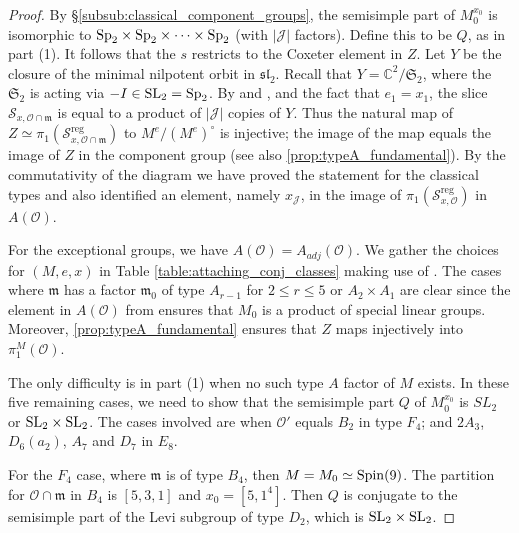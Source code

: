 \documentclass{amsart}
\theoremstyle{definition}
\DeclareMathOperator{\reg}{reg}
\newcommand{\C}{\mathbb{C}}
\newcommand{\cS}{\mathcal{S}}
\newcommand{\frakm}{\mathfrak{m}}
\newcommand{\frakS}{\mathfrak{S}}
\newcommand{\0}{\mathcal{O}}
\begin{document}
\begin{proof}
By \S \ref{subsub:classical_component_groups}, 
the semisimple part of 
$M_0^{x_0}$ is isomorphic to 
$\rm{Sp}_2 \times \rm{Sp}_2 \times \dots \times \rm{Sp}_2$ (with $|\mathcal J|$ factors).  Define this to be $Q$, as in part (1). It follows that the $s$ restricts to the Coxeter element in $Z$.
Let $Y$ be the closure of the minimal nilpotent orbit in $\mathfrak{sl}_2$.  
Recall that $Y = \C^2/\frakS_2$, where the $\frakS_2$ is acting via $-I \in \rm{SL}_2 = \rm{Sp}_2$.
By \cite{FJLS23} and \cite{Kraft-Procesi:classical}, and the fact that $e_1=x_1$,
the slice $\cS_{x, \0 \cap \frakm}$ is equal to a product of $|\mathcal J|$ copies of $Y$.  
Thus the natural map of $Z \simeq \pi_1(\cS^{\reg}_{x, \0 \cap \frakm})$ to  $M^e/(M^e)^\circ$ is injective; 
the image of the map equals the image of $Z$ in the component group (see 
also \cref{prop:typeA_fundamental}).  
By the commutativity of the diagram we have proved the statement for the classical types and also identified
an element, namely $x_{\mathcal J}$, in the image of $\pi_1(\cS^{\reg}_{x, \0})$ in $A(\0)$.

For the exceptional groups, we have $A(\0) = A_{adj}(\0)$.  We gather the choices for $(M,e,x)$ in Table \ref{table:attaching_conj_classes}
making use of \cite{Sommers:Bala-Carter}.
The cases where $\frakm$ has a factor $\frakm_0$
of type $A_{r-1}$ for $2 \leq r \leq 5$ or $A_2 \times A_1$ are clear since the element in $A(\0)$ from \cite{Sommers:Bala-Carter} ensures that $M_0$ is a product of special linear groups.  Moreover, 
\cref{prop:typeA_fundamental} ensures
that $Z$ maps injectively into $\pi_1^M(\0)$.

The only difficulty is in part (1) when no such type $A$ factor of $M$ exists.  In these five remaining cases, we need to show that the semisimple part $Q$ of $M_0^{x_0}$ is $SL_2$ or $\rm{SL}_2 \times \rm{SL}_2$.  The cases involved are when $\0'$ equals
$B_2$ in type $F_4$; and $2A_3$, $D_6(a_2)$, $A_7$ and $D_7$ in $E_8$.


For the $F_4$ case, 
where $\frakm$ is of type $B_4$, then $M=M_0 \simeq \rm{Spin}(9)$.
The partition for $\0\cap\frakm$ in $B_4$
is $[5,3,1]$ and $x_0=[5,1^4]$.  Then 
$Q$ is conjugate to the semisimple part of the 
Levi subgroup of type $D_2$, which is $\rm{SL}_2 \times \rm{SL}_2$.


\end{proof}
\end{document}

